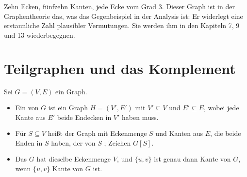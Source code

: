 \begin{merksatz}
\begin{center}
\begin{minipage}{0.88\textwidth}
\end{minipage}
\end{center}
\end{merksatz}

\begin{merksatz}
\begin{center}
\end{center}

Zehn Ecken, fünfzehn Kanten, jede Ecke vom Grad $3$. Dieser Graph ist in der Graphentheorie das, was das Gegenbeispiel in der Analysis ist: Er widerlegt eine erstaunliche Zahl plausibler Vermutungen. Sie werden ihm in den Kapiteln 7, 9 und 13 wiederbegegnen.
\end{merksatz}

\section{Teilgraphen und das Komplement}

\begin{definition}
Sei $G = (V,E)$ ein Graph.
\begin{itemize}[leftmargin=1.4em, itemsep=4pt]
\item Ein  von $G$ ist ein Graph $H = (V', E')$ mit $V' \subseteq V$ und $E' \subseteq E$, wobei jede Kante aus $E'$ beide Endecken in $V'$ haben muss.
\item Für $S \subseteq V$ heißt der Graph mit Eckenmenge $S$ und  Kanten aus $E$, die beide Enden in $S$ haben, der von $S$ ; Zeichen $G[S]$.
\item Das  $\overline{G}$ hat dieselbe Eckenmenge $V$, und $\{u,v\}$ ist genau dann Kante von $\overline{G}$, wenn $\{u,v\}$  Kante von $G$ ist.
\end{itemize}
\end{definition}

